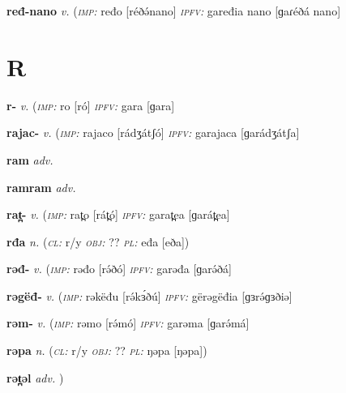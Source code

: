 {\newentry
\headword\textbf{ređ-nano}  
\ipa{[ɾéð-nano]}
\synpos\textit{v.} 
\imperative(\textit {\textsc{imp:}} ređo [réðə́nano]
\imperfective\textit{\textsc{ipfv:}} gaređia nano [ɡaɾéðá nano]

\section*{R}\label{R}

\newentry
\headword\textbf{r-}  
\ipa{[r-]}
\synpos\textit{v.} 
\imperative(\textit {\textsc{imp:}} ro [ró]
\imperfective\textit{\textsc{ipfv:}} gara [ɡara]


\newentry
\headword\textbf{rajac-}  
\ipa{[rádʒátʃ-]}
\synpos\textit{v.} 
\imperative(\textit {\textsc{imp:}} rajaco [rádʒátʃó]
\imperfective\textit{\textsc{ipfv:}} garajaca [ɡarádʒátʃa]

\newentry
\headword\textbf{ram}  
\ipa{[rám]}
\synpos\textit{adv.} 

\newentry
\headword\textbf{ramram}  
\ipa{[rámram]}
\synpos\textit{adv.} 

\newentry
\headword\textbf{rat̪-}  
\ipa{[rát̪-]}
\synpos\textit{v.} 
\imperative(\textit {\textsc{imp:}} rat̪o [rát̪ó] %
\imperfective\textit{\textsc{ipfv:}} garat̪ea [ɡarát̪ea]

\newentry
\headword\textbf{rđa}  
\ipa{[rða]}
\synpos\textit{n.} 
\class(\textit{\textsc{cl:}} {r/y}
\object\textit{\textsc{obj:}} ??
\plural\textit{\textsc{pl:}} eđa [eða])  

\newentry
\headword\textbf{rəđ-}  
\ipa{[rə́ð-]}
\synpos\textit{v.} 
\imperative(\textit {\textsc{imp:}} rəđo [rə́ðó]  
\imperfective\textit{\textsc{ipfv:}} garəđa [ɡarə́ðá]

\newentry
\headword\textbf{rəgëđ-}  
\ipa{[rə́ɡɜð-]}
\synpos\textit{v.} 
\imperative(\textit {\textsc{imp:}} rəkëđu [rə́kɜ́ðú] %
\imperfective\textit{\textsc{ipfv:}} gërəgëđia [ɡɜrə́ɡɜðiə]

\newentry
\headword\textbf{rəm-}  
\ipa{[rə́m-]}
\synpos\textit{v.} 
\imperative(\textit {\textsc{imp:}} rəmo [rə́mó]  
\imperfective\textit{\textsc{ipfv:}} garəma [ɡarə́má]

\newentry
\headword\textbf{rəpa}  
\ipa{[rəpa]}
\synpos\textit{n.} 
\class(\textit{\textsc{cl:}} {r/y}
\object\textit{\textsc{obj:}} ??
\plural\textit{\textsc{pl:}} ŋəpa [ŋəpa]) 

\newentry
\headword\textbf{rət̪əl}  
\ipa{[rət̪əl]}
\synpos\textit{adv.} 
)} 

